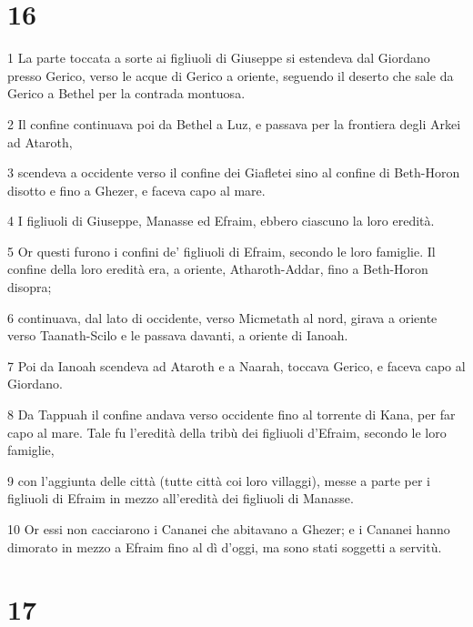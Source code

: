 \chapter{16}

\par 1 La parte toccata a sorte ai figliuoli di Giuseppe si estendeva dal Giordano presso Gerico, verso le acque di Gerico a oriente, seguendo il deserto che sale da Gerico a Bethel per la contrada montuosa.
\par 2 Il confine continuava poi da Bethel a Luz, e passava per la frontiera degli Arkei ad Ataroth,
\par 3 scendeva a occidente verso il confine dei Giafletei sino al confine di Beth-Horon disotto e fino a Ghezer, e faceva capo al mare.
\par 4 I figliuoli di Giuseppe, Manasse ed Efraim, ebbero ciascuno la loro eredità.
\par 5 Or questi furono i confini de' figliuoli di Efraim, secondo le loro famiglie. Il confine della loro eredità era, a oriente, Atharoth-Addar, fino a Beth-Horon disopra;
\par 6 continuava, dal lato di occidente, verso Micmetath al nord, girava a oriente verso Taanath-Scilo e le passava davanti, a oriente di Ianoah.
\par 7 Poi da Ianoah scendeva ad Ataroth e a Naarah, toccava Gerico, e faceva capo al Giordano.
\par 8 Da Tappuah il confine andava verso occidente fino al torrente di Kana, per far capo al mare. Tale fu l'eredità della tribù dei figliuoli d'Efraim, secondo le loro famiglie,
\par 9 con l'aggiunta delle città (tutte città coi loro villaggi), messe a parte per i figliuoli di Efraim in mezzo all'eredità dei figliuoli di Manasse.
\par 10 Or essi non cacciarono i Cananei che abitavano a Ghezer; e i Cananei hanno dimorato in mezzo a Efraim fino al dì d'oggi, ma sono stati soggetti a servitù.

\chapter{17}


